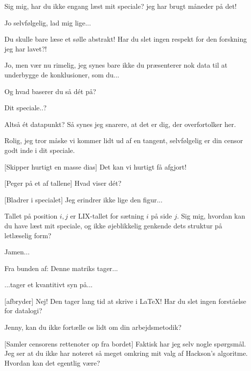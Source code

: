 \documentclass[a4paper,11pt]{article}
\begin{document}
\begin{sketch}
  Sig mig, har du ikke engang læst mit speciale? jeg
har brugt måneder på det!


 Jo selvfølgelig, lad mig lige... 

 Du skulle bare læse et sølle abstrakt!  Har du slet ingen
respekt for den forskning jeg har lavet?!

 Jo, men vær nu rimelig, jeg synes bare ikke du præsenterer
nok data til at underbygge de konklusioner, som du...

  Og hvad baserer du så dét på?

  Dit speciale..?

  Altså ét datapunkt?  Så synes jeg
snarere, at det er dig, der overfortolker her.

 Rolig, jeg tror måske vi kommer lidt ud af en tangent,
selvfølgelig er din censor godt inde i dit speciale.

[Skipper hurtigt en masse dias] Det kan vi hurtigt få
afgjort!


[Peger på et af tallene] Hvad viser dét?

[Bladrer i specialet] Jeg erindrer ikke lige den figur...

  Tallet
på position $i,j$ er LIX-tallet for sætning $i$ på side $j$.  Sig mig,
hvordan kan du have læst mit speciale, og ikke øjeblikkelig genkende
dets struktur på letlæselig form?

 Jamen...

 Fra bunden af: Denne matriks tager...

 ...tager et kvantitivt syn på...

[afbryder] Nej!  Den tager lang tid at skrive i \LaTeX{}!  Har
du slet ingen forståelse for datalogi?

  Jenny, kan du ikke
fortælle os lidt om din arbejdsmetodik?

[Samler censorens rettenoter op fra bordet] Faktisk har jeg
selv nogle spørgsmål.  Jeg ser at du ikke har noteret så meget omkring
mit valg af Hackson's algoritme.  Hvordan kan det egentlig være?


\end{sketch}
\end{document}
